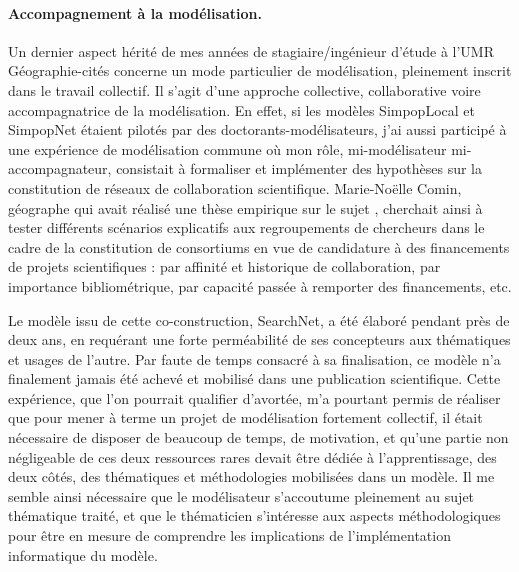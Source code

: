 \paragraph{Accompagnement à la modélisation.}

Un dernier aspect hérité de mes années de stagiaire/ingénieur d'étude à l'UMR Géographie-cités concerne un mode particulier de modélisation, pleinement inscrit dans le travail collectif.
Il s'agit d'une approche collective, collaborative voire accompagnatrice de la modélisation.
En effet, si les modèles SimpopLocal et SimpopNet étaient pilotés par des doctorants-modélisateurs, j'ai aussi participé à une expérience de modélisation commune où mon rôle, mi-modélisateur mi-accompagnateur, consistait à formaliser et implémenter des hypothèses sur la constitution de réseaux de collaboration scientifique.
Marie-Noëlle Comin, géographe qui avait réalisé une thèse empirique sur le sujet \autocite{comin_reseaux_2009}, cherchait ainsi à tester différents scénarios explicatifs aux regroupements de chercheurs dans le cadre de la constitution de consortiums en vue de candidature à des financements de projets scientifiques :
par affinité et historique de collaboration, par importance bibliométrique, par capacité passée à remporter des financements, etc.

Le modèle issu de cette co-construction, SearchNet, a été élaboré pendant près de deux ans, en requérant une forte perméabilité de ses concepteurs aux thématiques et usages de l'autre.
Par faute de temps consacré à sa finalisation, ce modèle n'a finalement jamais été achevé et mobilisé dans une publication scientifique.
Cette expérience, que l'on pourrait qualifier d'avortée, m'a pourtant permis de réaliser que pour mener à terme un projet de modélisation fortement collectif, il était nécessaire de disposer de beaucoup de temps, de motivation, et qu'une partie non négligeable de ces deux ressources rares devait être dédiée à l'apprentissage, des deux côtés, des thématiques et méthodologies mobilisées dans un modèle.
Il me semble ainsi nécessaire que le modélisateur s'accoutume pleinement au sujet thématique traité, et que le thématicien s'intéresse aux aspects méthodologiques pour être en mesure de comprendre les implications de l'implémentation informatique du modèle.

\bigskip
\paragraph[Conclusion intermédiaire]{}

